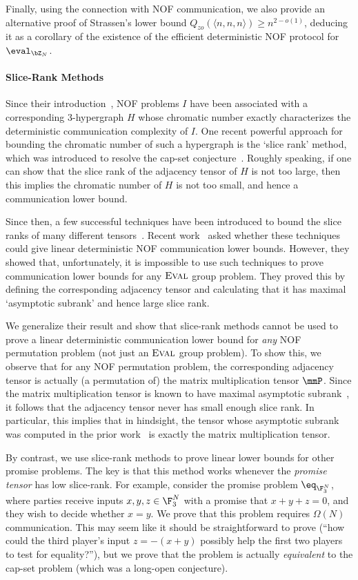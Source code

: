      Finally, using the connection with NOF communication, we also provide an alternative proof of Strassen's lower bound $Q_{zo}(\langle n,n,n \rangle) \geq n^{2 - o(1)}$, deducing it as a corollary of the existence of the efficient deterministic NOF protocol for $\eval_{\bZ_N}$.

     \paragraph{Slice-Rank Methods}

     Since their introduction~\cite{CFL83}, NOF problems $I$ have been associated with a corresponding 3-hypergraph $H$ whose chromatic number exactly characterizes the deterministic communication complexity of $I$. One recent powerful approach for bounding the chromatic number of such a hypergraph is the `slice rank' method, which was introduced to resolve the cap-set conjecture~\cite{CLP17,ED17}. Roughly speaking, if one can show that the slice rank of the adjacency tensor of $H$ is not too large, then this implies the chromatic number of $H$ is not too small, and hence a communication lower bound.
     
     Since then, a few successful techniques have been introduced to bound the slice ranks of many different tensors~\cite{T16,BCHGNSU17}. Recent work~\cite{CFTZ22} asked whether these techniques could give linear deterministic NOF communication lower bounds. However, they showed that, unfortunately, it is impossible to use such techniques to prove communication lower bounds for any $\textsc{Eval}$ group problem. They proved this by defining the corresponding adjacency tensor and calculating that it has maximal `asymptotic subrank' and hence large slice rank.

     We generalize their result and show that slice-rank methods cannot be used to prove a linear deterministic communication lower bound for \emph{any} NOF permutation problem (not just an $\textsc{Eval}$ group problem). To show this, we observe that for any NOF permutation problem, the corresponding adjacency tensor is actually (a permutation of) the matrix multiplication tensor $\mmP$. Since the matrix multiplication tensor is known to have maximal asymptotic subrank~\cite{S86}, it follows that the adjacency tensor never has small enough slice rank. In particular, this implies that in hindsight, the tensor whose asymptotic subrank was computed in the prior work~\cite{CFTZ22} is exactly the matrix multiplication tensor.

     By contrast, we use slice-rank methods to prove linear lower bounds for other promise problems. The key is that this method works whenever the \emph{promise tensor} has low slice-rank. For example, consider the promise problem $\eq_{\F_3^N}$, where parties receive inputs $x,y,z \in \F_3^N$ with a promise that $x+y+z = 0$, and they wish to decide whether $x=y$. We prove that this problem requires $\Omega(N)$ communication. This may seem like it should be straightforward to prove (``how could the third player's input $z=-(x+y)$ possibly help the first two players to test for equality?''), but we prove that the problem is actually \emph{equivalent} to the cap-set problem (which was a long-open conjecture).

